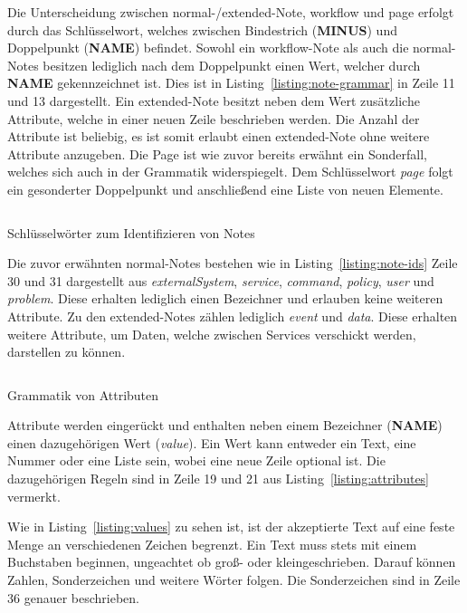 Die Unterscheidung zwischen normal-/extended-Note, workflow und page erfolgt durch das Schlüsselwort, welches zwischen Bindestrich (\textbf{MINUS}) und Doppelpunkt (\textbf{NAME}) befindet.
Sowohl ein workflow-Note als auch die normal-Notes besitzen lediglich nach dem Doppelpunkt einen Wert, welcher durch \textbf{NAME} gekennzeichnet ist.
Dies ist in Listing~\ref{listing:note-grammar} in Zeile 11 und 13 dargestellt.
Ein extended-Note besitzt neben dem Wert zusätzliche Attribute, welche in einer neuen Zeile beschrieben werden.
Die Anzahl der Attribute ist beliebig, es ist somit erlaubt einen extended-Note ohne weitere Attribute anzugeben.
Die Page ist wie zuvor bereits erwähnt ein Sonderfall, welches sich auch in der Grammatik widerspiegelt.
Dem Schlüsselwort \textit{page} folgt ein gesonderter Doppelpunkt und anschließend eine Liste von neuen Elemente.

\begin{listing}[!ht]
    \inputminted[firstnumber=30]{antlr-java}{listings/3.1.3/Keywords.g4}
    \caption{Schlüsselwörter zum Identifizieren von Notes}
    \label{listing:note-ids}
\end{listing}

Die zuvor erwähnten normal-Notes bestehen wie in Listing~\ref{listing:note-ids} Zeile 30 und 31 dargestellt aus \textit{externalSystem}, \textit{service}, \textit{command}, \textit{policy}, \textit{user} und \textit{problem}.
Diese erhalten lediglich einen Bezeichner und erlauben keine weiteren Attribute.
Zu den extended-Notes zählen lediglich \textit{event} und \textit{data}.
Diese erhalten weitere Attribute, um Daten, welche zwischen Services verschickt werden, darstellen zu können.

\begin{listing}[!ht]
    \inputminted[firstnumber=19]{antlr-java}{listings/3.1.3/Attribute.g4}
    \caption{Grammatik von Attributen}
    \label{listing:attributes}
\end{listing}

Attribute werden eingerückt und enthalten neben einem Bezeichner (\textbf{NAME}) einen dazugehörigen Wert (\textit{value}).
Ein Wert kann entweder ein Text, eine Nummer oder eine Liste sein, wobei eine neue Zeile optional ist.
Die dazugehörigen Regeln sind in Zeile 19 und 21 aus Listing~\ref{listing:attributes} vermerkt.

Wie in Listing~\ref{listing:values} zu sehen ist, ist der akzeptierte Text auf eine feste Menge an verschiedenen Zeichen begrenzt.
Ein Text muss stets mit einem Buchstaben beginnen, ungeachtet ob groß- oder kleingeschrieben.
Darauf können Zahlen, Sonderzeichen und weitere Wörter folgen.
Die Sonderzeichen sind in Zeile 36 genauer beschrieben.

